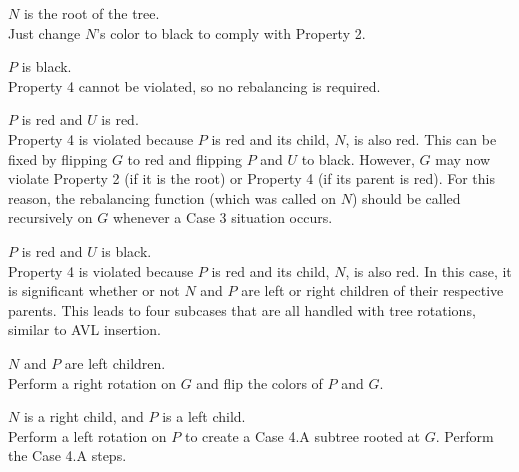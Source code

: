 \begin{description}[1cm]
	\item[\underline{Case 1}:] $N$ is the root of the tree. \\
	
	Just change $N$'s color to black to comply with Property 2. \\
	
	\item[\underline{Case 2}:] $P$ is black. \\
	
	Property 4 cannot be violated, so no rebalancing is required. \\
	
	\item[\underline{Case 3}:] $P$ is red and $U$ is red. \\
	
	Property 4 is violated because $P$ is red and its child, $N$, is also red. This can be fixed by flipping $G$ to red and flipping $P$ and $U$ to black. However, $G$ may now violate Property 2 (if it is the root) or Property 4 (if its parent is red). For this reason, the rebalancing function (which was called on $N$) should be called recursively on $G$ whenever a Case 3 situation occurs. \\
	
	\item[\underline{Case 4}:] $P$ is red and $U$ is black. \\
	
	Property 4 is violated because $P$ is red and its child, $N$, is also red. In this case, it is significant whether or not $N$ and $P$ are left or right children of their respective parents. This leads to four subcases that are all handled with tree rotations, similar to AVL insertion. \\
	
	\begin{description}[1cm]
		\item[\underline{Case 4.A}:] $N$ and $P$ are left children. \\
		
		Perform a right rotation on $G$ and flip the colors of $P$ and $G$. \\
		
		\item[\underline{Case 4.B}:] $N$ is a right child, and $P$ is a left child. \\
		
		Perform a left rotation on $P$ to create a Case 4.A subtree rooted at $G$. Perform the Case 4.A steps. \\
		

\end{description}
\end{description}
